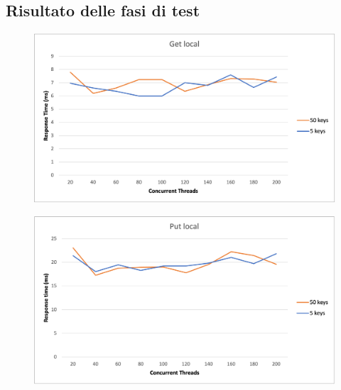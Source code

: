 \documentclass[conference]{IEEEtran}
\begin{document}
\subsection{Risultato delle fasi di test}

\begin{figure}[h]
  \includegraphics[scale=0.5]{images/getlocal.png}
\end{figure}
\begin{figure}[h]
  \includegraphics[scale=0.5]{images/putlocal.png}
\end{figure}
\end{document}
